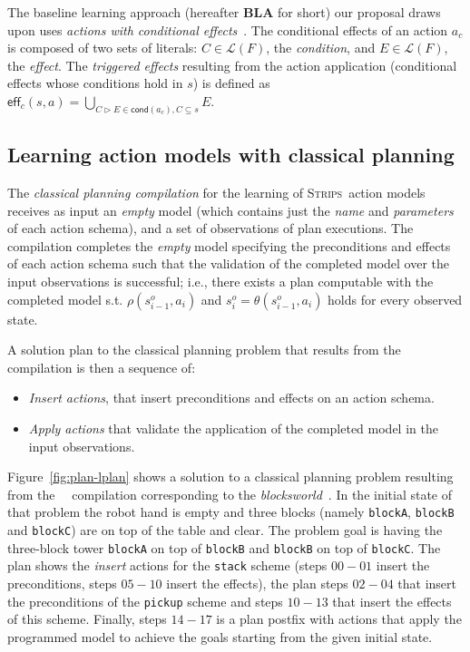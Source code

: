 \documentclass{article}
\newcommand{\eff}{\mathsf{eff}}     %
\newcommand{\cond}{\mathsf{cond}}   %
\newcommand{\strips}{\textsc{Strips}}
\begin{document}
The baseline learning approach (hereafter \textbf{BLA} for short) our proposal draws upon uses {\em actions with conditional effects}~\cite{aineto2018learning}. The conditional effects of an action $a_c$ is composed of two sets of literals: $C\in\mathcal{L}(F)$, the {\em condition}, and $E\in\mathcal{L}(F)$, the {\em effect}. The {\em triggered effects} resulting from the action application (conditional effects whose conditions hold in $s$) is defined as $\eff_c(s,a)=\bigcup_{C\rhd E\in\cond(a_c),C\subseteq s} E$.

\subsection{Learning action models with classical planning}
\label{FAMA}

The {\em classical planning compilation} for the learning of \strips\ action models~\cite{aineto2018learning} receives as input an {\em empty} model (which contains just the {\em name} and {\em parameters} of each action schema), and a set of observations of plan executions. The compilation completes the {\em empty} model specifying the preconditions and effects of each action schema such that the validation of the completed model over the input observations is successful; i.e., there exists a plan computable with the completed model s.t. $\rho(s_{i-1}^o,a_i)$ and $s_i^o=\theta(s_{i-1}^o,a_i)$ holds for every observed state.

A solution plan to the classical planning problem that results from the compilation is then a sequence of:
\begin{itemize}
\item \emph{Insert actions}, that insert preconditions and effects on an action schema.
\item \emph{Apply actions} that validate the application of the completed model in the input observations.
\end{itemize}
Figure~\ref{fig:plan-lplan} shows a solution to a classical planning problem resulting from the~\citeauthor{aineto2018learning}~\citeyear{aineto2018learning} compilation corresponding to the {\em blocksworld}~\cite{slaney2001blocks}. In the initial state of that problem the robot hand is empty and three blocks (namely {\small\tt blockA}, {\small\tt blockB} and {\small\tt blockC}) are on top of the table and clear. The problem goal is having the three-block tower {\tt blockA} on top of {\tt blockB} and {\tt blockB} on top of {\tt blockC}. The plan shows the {\em insert} actions for the {\tt\small stack} scheme (steps $00-01$ insert the preconditions, steps $05-10$ insert the effects), the plan steps $02-04$ that  insert the preconditions of the {\tt\small pickup} scheme and steps $10-13$ that insert the effects of this scheme. Finally, steps $14-17$ is a plan postfix with actions that apply the programmed model to achieve the goals starting from the given initial state.
\end{document}
